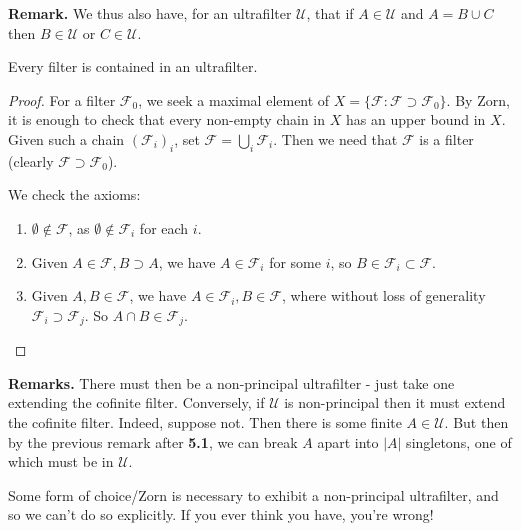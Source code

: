 \documentclass[10pt,a4paper]{article}
\begin{document}
\textbf{Remark.} We thus also have, for an ultrafilter $\mathcal{U}$, that if $A \in \mathcal{U}$ and $A = B \cup C$ then $B \in \mathcal{U}$ or $C \in \mathcal{U}$.
\begin{theorem}
  Every filter is contained in an ultrafilter.
\end{theorem}
\begin{proof}
  For a filter $\mathcal{F}_0$, we seek a maximal element of $X = \{\mathcal{F}: \mathcal{F} \supset \mathcal{F}_0\}$. By Zorn, it is enough to check that every non-empty chain in $X$ has an upper bound in $X$. Given such a chain $(\mathcal{F}_i)_i$, set $\mathcal{F} = \bigcup_i \mathcal{F}_i$. Then we need that $\mathcal{F}$ is a filter (clearly $\mathcal{F} \supset \mathcal{F}_0$).

  We check the axioms:
  \begin{enumerate}
    \item $\emptyset \notin \mathcal{F}$, as $\emptyset \notin \mathcal{F}_i$ for each $i$.
    \item Given $A \in \mathcal{F}, B \supset A$, we have $A \in \mathcal{F}_i$ for some $i$, so $B \in \mathcal{F}_i \subset \mathcal{F}$.
    \item Given $A, B \in \mathcal{F}$, we have $A \in \mathcal{F}_i, B \in \mathcal{F}$, where without loss of generality $\mathcal{F}_i \supset \mathcal{F}_j$. So $A \cap B \in \mathcal{F}_j$.
  \end{enumerate}
\end{proof}
\textbf{Remarks.} There must then be a non-principal ultrafilter - just take one extending the cofinite filter. Conversely, if $\mathcal{U}$ is non-principal then it must extend the cofinite filter. Indeed, suppose not. Then there is some finite $A \in \mathcal{U}$. But then by the previous remark after \textbf{5.1}, we can break $A$ apart into $|A|$ singletons, one of which must be in $\mathcal{U}$.

Some form of choice/Zorn is necessary to exhibit a non-principal ultrafilter, and so we can't do so explicitly. If you ever think you have, you're wrong!
\end{document}
